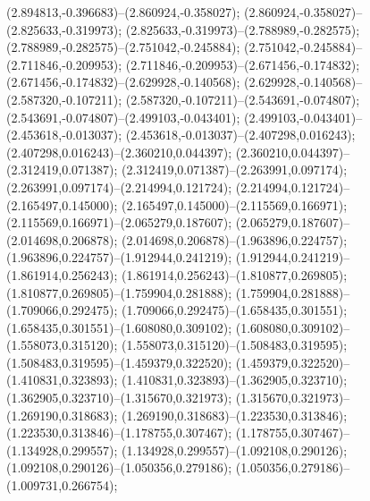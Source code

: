  (2.894813,-0.396683)--(2.860924,-0.358027);
 (2.860924,-0.358027)--(2.825633,-0.319973);
 (2.825633,-0.319973)--(2.788989,-0.282575);
 (2.788989,-0.282575)--(2.751042,-0.245884);
 (2.751042,-0.245884)--(2.711846,-0.209953);
 (2.711846,-0.209953)--(2.671456,-0.174832);
 (2.671456,-0.174832)--(2.629928,-0.140568);
 (2.629928,-0.140568)--(2.587320,-0.107211);
 (2.587320,-0.107211)--(2.543691,-0.074807);
 (2.543691,-0.074807)--(2.499103,-0.043401);
 (2.499103,-0.043401)--(2.453618,-0.013037);
 (2.453618,-0.013037)--(2.407298,0.016243);
 (2.407298,0.016243)--(2.360210,0.044397);
 (2.360210,0.044397)--(2.312419,0.071387);
 (2.312419,0.071387)--(2.263991,0.097174);
 (2.263991,0.097174)--(2.214994,0.121724);
 (2.214994,0.121724)--(2.165497,0.145000);
 (2.165497,0.145000)--(2.115569,0.166971);
 (2.115569,0.166971)--(2.065279,0.187607);
 (2.065279,0.187607)--(2.014698,0.206878);
 (2.014698,0.206878)--(1.963896,0.224757);
 (1.963896,0.224757)--(1.912944,0.241219);
 (1.912944,0.241219)--(1.861914,0.256243);
 (1.861914,0.256243)--(1.810877,0.269805);
 (1.810877,0.269805)--(1.759904,0.281888);
 (1.759904,0.281888)--(1.709066,0.292475);
 (1.709066,0.292475)--(1.658435,0.301551);
 (1.658435,0.301551)--(1.608080,0.309102);
 (1.608080,0.309102)--(1.558073,0.315120);
 (1.558073,0.315120)--(1.508483,0.319595);
 (1.508483,0.319595)--(1.459379,0.322520);
 (1.459379,0.322520)--(1.410831,0.323893);
 (1.410831,0.323893)--(1.362905,0.323710);
 (1.362905,0.323710)--(1.315670,0.321973);
 (1.315670,0.321973)--(1.269190,0.318683);
 (1.269190,0.318683)--(1.223530,0.313846);
 (1.223530,0.313846)--(1.178755,0.307467);
 (1.178755,0.307467)--(1.134928,0.299557);
 (1.134928,0.299557)--(1.092108,0.290126);
 (1.092108,0.290126)--(1.050356,0.279186);
 (1.050356,0.279186)--(1.009731,0.266754);
